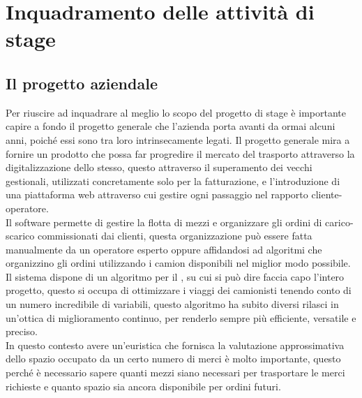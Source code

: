 
\hypertarget{(chap:capitolo3)}{}
\chapter{Inquadramento delle attività di stage}
\section{Il progetto aziendale}
Per riuscire ad inquadrare al meglio lo scopo del progetto di stage è importante capire a fondo il progetto generale che l'azienda porta avanti da ormai alcuni anni, poiché essi sono tra loro intrinsecamente legati. Il progetto generale mira a fornire un prodotto che possa far progredire il mercato del trasporto attraverso la digitalizzazione dello stesso, questo attraverso il superamento dei vecchi gestionali, utilizzati concretamente solo per la fatturazione, e l'introduzione di una piattaforma web attraverso cui gestire ogni passaggio nel rapporto cliente-operatore.\\
Il software permette di gestire la flotta di mezzi e organizzare gli ordini di carico-scarico commissionati dai clienti, questa organizzazione può essere fatta manualmente da un operatore esperto oppure affidandosi ad algoritmi che organizzino gli ordini utilizzando i camion disponibili nel miglior modo possibile.\\
Il sistema dispone di un algoritmo per il , su cui si può dire faccia capo l'intero progetto, questo si occupa di ottimizzare i viaggi dei camionisti tenendo conto di un numero incredibile di variabili, questo algoritmo ha subito diversi rilasci in un'ottica di miglioramento continuo, per renderlo sempre più efficiente, versatile e preciso.\\
In questo contesto avere un'euristica che fornisca la valutazione approssimativa dello spazio occupato da un certo numero di merci è molto importante, questo perché è necessario sapere quanti mezzi siano necessari per trasportare le merci richieste e quanto spazio sia ancora disponibile per ordini futuri.

